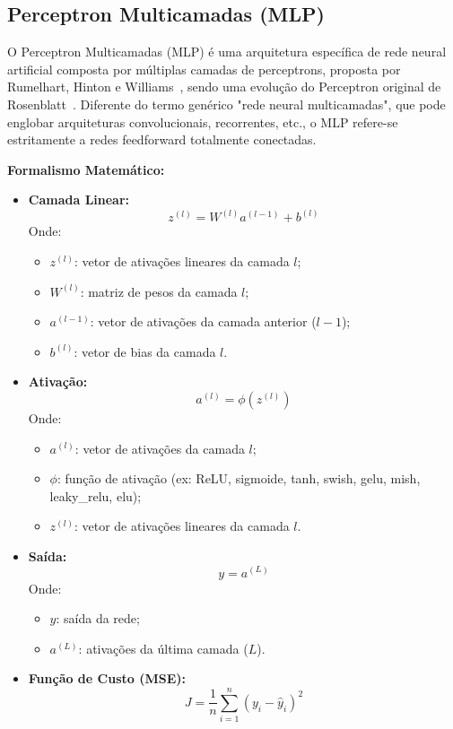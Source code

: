 \documentclass[11pt]{article}
\begin{document}
\subsection{Perceptron Multicamadas (MLP)}
O Perceptron Multicamadas (MLP) é uma arquitetura específica de rede neural artificial composta por múltiplas camadas de perceptrons, proposta por Rumelhart, Hinton e Williams~\cite{rumelhart1986learning}, sendo uma evolução do Perceptron original de Rosenblatt~\cite{rosenblatt1958perceptron}. Diferente do termo genérico "rede neural multicamadas", que pode englobar arquiteturas convolucionais, recorrentes, etc., o MLP refere-se estritamente a redes feedforward totalmente conectadas.

\textbf{Formalismo Matemático:}
\begin{itemize}
    \item \textbf{Camada Linear:}
    \[
    z^{(l)} = W^{(l)} a^{(l-1)} + b^{(l)}
    \]
    Onde:
    \begin{itemize}
        \item $z^{(l)}$: vetor de ativações lineares da camada $l$;
        \item $W^{(l)}$: matriz de pesos da camada $l$;
        \item $a^{(l-1)}$: vetor de ativações da camada anterior ($l-1$);
        \item $b^{(l)}$: vetor de bias da camada $l$.
    \end{itemize}
    \item \textbf{Ativação:}
    \[
    a^{(l)} = \phi(z^{(l)})
    \]
    Onde:
    \begin{itemize}
        \item $a^{(l)}$: vetor de ativações da camada $l$;
        \item $\phi$: função de ativação (ex: ReLU, sigmoide, tanh, swish, gelu, mish, leaky\_relu, elu);
        \item $z^{(l)}$: vetor de ativações lineares da camada $l$.
    \end{itemize}
    \item \textbf{Saída:}
    \[
    y = a^{(L)}
    \]
    Onde:
    \begin{itemize}
        \item $y$: saída da rede;
        \item $a^{(L)}$: ativações da última camada ($L$).
    \end{itemize}
    \item \textbf{Função de Custo (MSE):}
    \[
    J = \frac{1}{n} \sum_{i=1}^n (y_i - \hat{y}_i)^2
\]
\end{itemize}
\end{document}
